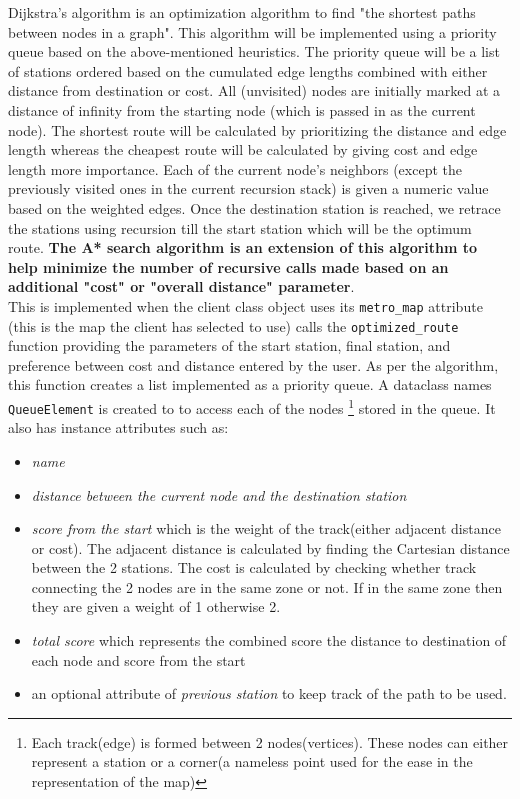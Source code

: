 \documentclass[fontsize=11pt]{article}
\begin{document}
    Dijkstra's algorithm is an optimization algorithm to find "the shortest paths between nodes in a graph". This algorithm will be implemented using a priority queue based on the above-mentioned heuristics. The priority queue will be a list of stations ordered based on the cumulated edge lengths combined with either distance from destination or cost. All (unvisited) nodes are initially marked at a distance of infinity from the starting node (which is passed in as the current node). The shortest route will be calculated by prioritizing the distance and edge length whereas the cheapest route will be calculated by giving cost and edge length more importance. Each of the current node's neighbors (except the previously visited ones in the current recursion stack) is given a numeric value based on the weighted edges. Once the destination station is reached, we retrace the stations using recursion till the start station which will be the optimum route. \textbf{The A* search algorithm is an extension of this algorithm to help minimize the number of recursive calls made based on an additional "cost" or "overall distance" parameter}.\\
    This is implemented when the client class object uses its \texttt{metro\_map} attribute (this is the map the client has selected to use) calls the \texttt{optimized\_route} function providing the parameters of the start station, final station, and preference between cost and distance entered by the user. As per the algorithm, this function creates a list implemented as a priority queue. A dataclass names \texttt{QueueElement} is created to to access each of the nodes \footnote{Each track(edge) is formed between 2 nodes(vertices). These nodes can either represent a station or a corner(a nameless point used for the ease in the representation of the map)} stored in the queue. It also has instance attributes such as:
    \begin{itemize}
        \item  \textit{name}
        \item \textit{distance between the current node and the destination station }
        \item \textit{score from the start} which is the weight of the track(either adjacent distance or cost). The adjacent distance is calculated by finding the Cartesian distance between the 2 stations. The cost is calculated by checking whether track connecting the 2 nodes are in the same zone or not. If in the same zone then they are given a weight of 1 otherwise 2.
        \item \textit{total score} which represents the combined score the distance to destination of each node and score from the start
        \item an optional attribute of \textit{previous station} to keep track of the path to be used.
    \end{itemize}
\end{document}
